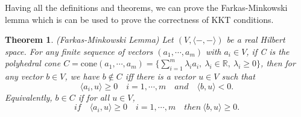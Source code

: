 \documentclass[a4paper]{report}
\newtheorem{theorem}{Theorem}[section]
\begin{document}
Having all the definitions and theorems, we can prove the Farkas-Minkowski lemma which is can be used to prove the correctness of KKT conditions.

\begin{theorem}
    (Farkas-Minkowski Lemma\cite{gallier2019algebra}) Let $(V,\langle -,- \rangle)$ be a real Hilbert space. For any finite sequence of vectors $(a_1,\cdots,a_m)$ with $a_i\in V$, if C is the polyhedral cone $C=\mathrm{cone}(a_1,\cdots,a_m)=\{ \sum_{i=1}^{m} \lambda_i a_i, \ \lambda_i\in \mathbb R, \ \lambda_i \geq 0\}$, then for any vector $b\in V$, we have $b\notin C$ iff there is a vector $u\in V$ such that
    \[
        \langle a_i, u\rangle \geq 0 \quad i=1,\cdots,m \quad and \quad \langle b, u \rangle <0.
    \]
    Equivalently, $b\in C$ if for all $u\in V$,
    \[
        if \quad \langle a_i,u\rangle \geq 0 \quad i=1,\cdots,m\quad then \ \langle b,u\rangle \geq 0.
    \]
\end{theorem}
\end{document}
